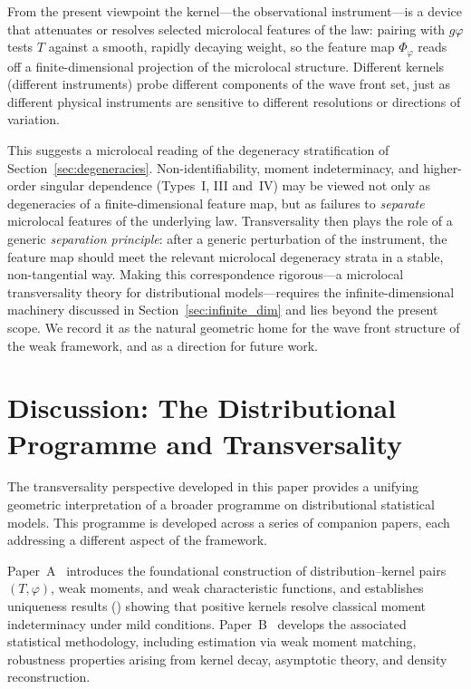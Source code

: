 \documentclass[11pt,a4paper]{article}
\begin{document}
From the present viewpoint the kernel---the observational instrument---is a
device that attenuates or resolves selected microlocal features of the law:
pairing with $g\varphi$ tests $T$ against a smooth, rapidly decaying weight, so
the feature map $\Phi_\varphi$ reads off a finite-dimensional projection of the
microlocal structure.  Different kernels (different instruments) probe
different components of the wave front set, just as different physical
instruments are sensitive to different resolutions or directions of variation.

This suggests a microlocal reading of the degeneracy stratification of
Section~\ref{sec:degeneracies}.  Non-identifiability, moment indeterminacy, and
higher-order singular dependence (Types~I, III and~IV) may be viewed not only
as degeneracies of a finite-dimensional feature map, but as failures to
\emph{separate} microlocal features of the underlying law.  Transversality then
plays the role of a generic \emph{separation principle}: after a generic
perturbation of the instrument, the feature map should meet the relevant
microlocal degeneracy strata in a stable, non-tangential way.  Making this
correspondence rigorous---a microlocal transversality theory for distributional
models---requires the infinite-dimensional machinery discussed in
Section~\ref{sec:infinite_dim} and lies beyond the present scope.  We record it
as the natural geometric home for the wave front structure of the weak
framework, and as a direction for future work.


\section{Discussion: The Distributional Programme and Transversality}
\label{sec:discussion-programme}

The transversality perspective developed in this paper provides a unifying
geometric interpretation of a broader programme on distributional statistical
models. This programme is developed across a series of companion papers, each
addressing a different aspect of the framework.

\medskip

Paper~A~\cite{A} introduces the foundational construction of
distribution--kernel pairs $(T,\varphi)$, weak moments, and weak
characteristic functions, and establishes uniqueness results
(\cite[Theorems~6.2, 6.4 and~6.8]{A}) showing that positive kernels resolve
classical moment indeterminacy under mild conditions. Paper~B~\cite{B} develops the associated statistical methodology,
including estimation via weak moment matching, robustness properties arising
from kernel decay, asymptotic theory, and density reconstruction.
\end{document}
